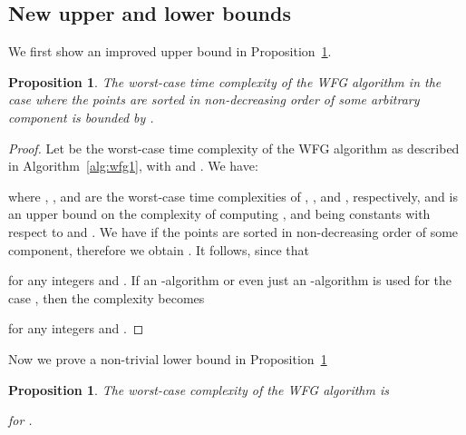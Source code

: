 \documentclass[a4paper,11pt]{article}
\newtheorem{proposition}[lemma]{Proposition}
\begin{document}
\subsection{New upper and lower bounds}\label{sub:wfg_complex}

We first show an improved upper bound in Proposition~\ref{prop:wfg-complexity}.

\begin{proposition}\label{prop:wfg-complexity}
  The worst-case time complexity of the WFG algorithm 
  in the case where the points are sorted in non-decreasing order of some arbitrary component 
  is bounded by .
\end{proposition}

\begin{proof}
  Let  be the worst-case time complexity of the WFG algorithm 
  as described in Algorithm~\ref{alg:wfg1}, 
  with  and . We have:
  
  where , , and  are the 
  worst-case time complexities of \WFG{}, \WFG{}, and \WFG{}, respectively,
  and  is an upper bound on the complexity of computing ,
   and  being constants with respect to  and .  
  We have  if the points are sorted in non-decreasing order of some component, therefore we obtain 
  . It follows, since  that 
  
  for any integers  and .
  If an -algorithm \citep{BeuFonLopPaqVah09} or even just
  an -algorithm is used for the case , then the complexity becomes
  
  for any integers  and .
\end{proof}



Now we prove a non-trivial lower bound in Proposition~\ref{prop:wfg-complexity1}

\begin{proposition}\label{prop:wfg-complexity1}
  The worst-case complexity of the WFG algorithm is 
  
  for .
\end{proposition}
\end{document}

